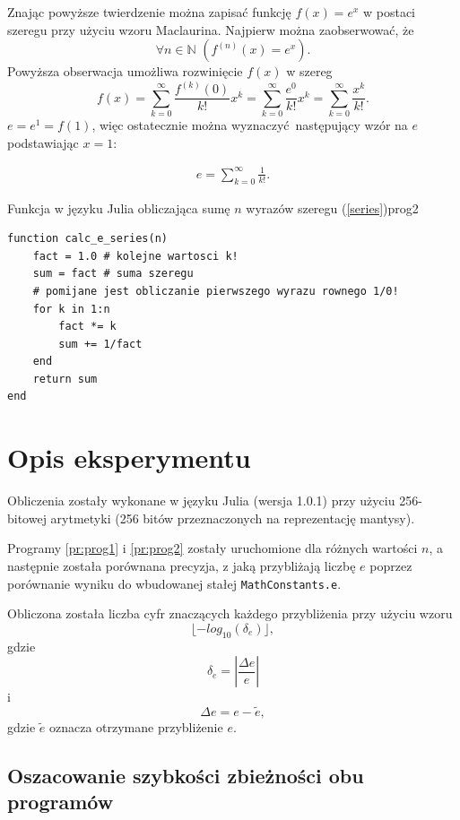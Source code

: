 \documentclass[12pt]{article}
\begin{document}
Znając powyższe twierdzenie można zapisać funkcję $f(x) = e^x$ w postaci szeregu przy
użyciu wzoru Maclaurina.
Najpierw można zaobserwować, że \large$$\forall{n \in \mathds{N}}\,\,( f^{(n)}(x) = e^x).$$\normalsize
Powyższa obserwacja umożliwa rozwinięcie $f(x)$ w szereg
$$f(x) = \sum_{k = 0}^{\infty}\frac{f^{(k)}(0)}{k!}x^k 
= \sum_{k = 0}^{\infty}\frac{e^0}{k!}x^k
= \sum_{k = 0}^{\infty}\frac{x^k}{k!}.$$
$e = e^1 = f(1)$, więc ostatecznie można wyznaczyć następujący wzór na $e$ podstawiając $x = 1$:

\large
\begin{align}
e = \sum_{k = 0}^{\infty}\frac{1}{k!}. \label{series}
\end{align}\normalsize

\begin{prog}{Funkcja w języku Julia obliczająca sumę $n$ wyrazów szeregu (\ref{series})}{prog2}
    \begin{lstlisting}
function calc_e_series(n)
    fact = 1.0 # kolejne wartosci k!
    sum = fact # suma szeregu
    # pomijane jest obliczanie pierwszego wyrazu rownego 1/0!
    for k in 1:n
        fact *= k
        sum += 1/fact
    end
    return sum
end
    \end{lstlisting}
\end{prog}

\section{Opis eksperymentu}

Obliczenia zostały wykonane w języku Julia (wersja 1.0.1)
przy użyciu 256-bitowej arytmetyki (256 bitów przeznaczonych na reprezentację mantysy).

Programy \ref{pr:prog1} i \ref{pr:prog2} zostały uruchomione dla różnych wartości $n$,
a następnie została porównana precyzja, z jaką przybliżają liczbę $e$ poprzez porównanie wyniku
do wbudowanej stałej \texttt{MathConstants.e}. 

Obliczona została liczba cyfr znaczących
każdego przybliżenia przy użyciu wzoru
\large$$\lfloor - log_{10}(\delta_e) \rfloor,$$\normalsize gdzie 
\large$$\delta_e = |\frac{\Delta e}{e}|$$\normalsize
i 
\large$$\Delta e = e - \widetilde{e},$$\normalsize
gdzie $\widetilde{e}$ oznacza otrzymane przybliżenie $e$.

\subsection{Oszacowanie szybkości zbieżności obu programów}
\end{document}
